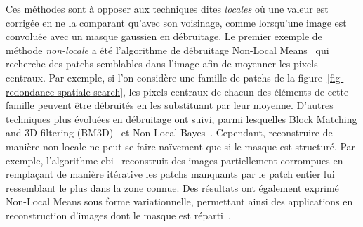 Ces méthodes sont à opposer aux techniques dites \emph{locales} où une valeur est corrigée en ne la comparant qu'avec son voisinage, comme lorsqu'une image est convoluée avec un masque gaussien en débruitage. Le premier exemple de méthode \emph{non-locale} a été l'algorithme de débruitage Non-Local Means~\cite{buades2005non} qui recherche des patchs semblables dans l'image afin de moyenner les pixels centraux. Par exemple, si l'on considère une famille de patchs de la figure~\ref{fig-redondance-spatiale-search}, les pixels centraux de chacun des éléments de cette famille peuvent être débruités en les substituant par leur moyenne. D'autres techniques plus évoluées en débruitage ont suivi, parmi lesquelles Block Matching and 3D filtering (BM3D)~\cite{dabov2007image} et Non Local Bayes~\cite{lebrun2013nonlocal}. Cependant, reconstruire de manière non-locale ne peut se faire naïvement que si le masque est structuré. Par exemple, l'algorithme \gls{ebi}~\cite{criminisi2004region} reconstruit des images partiellement corrompues en remplaçant de manière itérative les patchs manquants par le patch entier lui ressemblant le plus dans la zone connue. Des résultats ont également exprimé Non-Local Means sous forme variationnelle, permettant ainsi des applications en reconstruction d'images dont le masque est réparti~\cite{peyre2008non, unni2018non, arias2009variational, yang2012nonlocal}.

